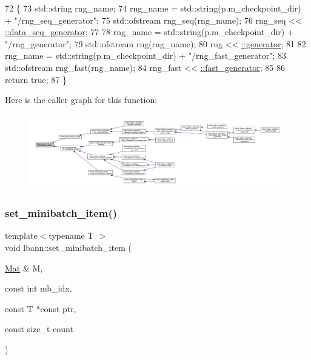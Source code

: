 \begin{DoxyCode}
72                                               \{
73   std::string rng\_name;
74   rng\_name = std::string(p.m\_checkpoint\_dir) + \textcolor{stringliteral}{"/rng\_seq\_generator"};
75   std::ofstream rng\_seq(rng\_name);
76   rng\_seq << \hyperlink{namespaceanonymous__namespace_02random_8cpp_03_ac1d3d0259f3e9c9b75e9701ae727d16e}{::data\_seq\_generator};
77   
78   rng\_name = std::string(p.m\_checkpoint\_dir) + \textcolor{stringliteral}{"/rng\_generator"};
79   std::ofstream rng(rng\_name);
80   rng << \hyperlink{namespaceanonymous__namespace_02random_8cpp_03_a83826c4b587d1825f13b833be6fe047f}{::generator};
81   
82   rng\_name = std::string(p.m\_checkpoint\_dir) + \textcolor{stringliteral}{"/rng\_fast\_generator"};
83   std::ofstream rng\_fast(rng\_name);
84   rng\_fast << \hyperlink{namespaceanonymous__namespace_02random_8cpp_03_a349f572cec05cd0e2469b799774a8602}{::fast\_generator};
85 
86   \textcolor{keywordflow}{return} \textcolor{keyword}{true};
87 \}
\end{DoxyCode}
Here is the caller graph for this function\+:\nopagebreak
\begin{figure}[H]
\begin{center}
\leavevmode
\includegraphics[width=350pt]{namespacelbann_af68acf5b249e5360289d4c6a7bfa8985_icgraph}
\end{center}
\end{figure}
\mbox{\label{namespacelbann_a93facff1f3ce4e10e5d25cf80077fb93}} 
\subsubsection{\texorpdfstring{set\+\_\+minibatch\+\_\+item()}{set\_minibatch\_item()}}
{\footnotesize\ttfamily template$<$typename T $>$ \\
void lbann\+::set\+\_\+minibatch\+\_\+item (\begin{DoxyParamCaption}\item[{\hyperlink{base_8hpp_a68f11fdc31b62516cb310831bbe54d73}{Mat} \&}]{M,  }\item[{const int}]{mb\+\_\+idx,  }\item[{const T $\ast$const}]{ptr,  }\item[{const size\+\_\+t}]{count }\end{DoxyParamCaption})\hspace{0.3cm}{\ttfamily [inline]}}



